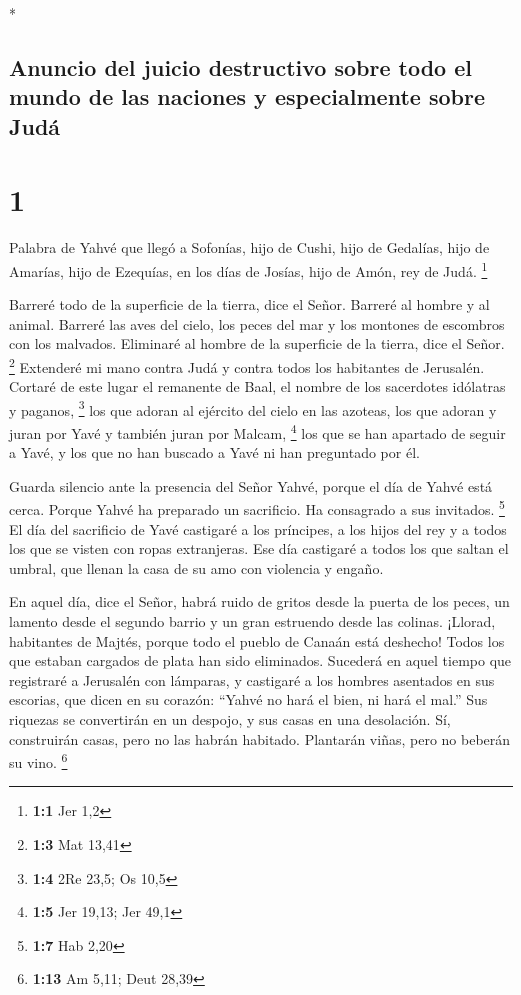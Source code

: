 \begin{paracol}{2} \switchcolumn[0]*

\hypertarget{anuncio-del-juicio-destructivo-sobre-todo-el-mundo-de-las-naciones-y-especialmente-sobre-juduxe1}{%
\subsection{Anuncio del juicio destructivo sobre todo el mundo de las
naciones y especialmente sobre
Judá}\label{anuncio-del-juicio-destructivo-sobre-todo-el-mundo-de-las-naciones-y-especialmente-sobre-juduxe1}}

\hypertarget{section}{%
\section{1}\label{section}}

 Palabra de Yahvé que llegó a Sofonías, hijo de Cushi,
hijo de Gedalías, hijo de Amarías, hijo de Ezequías, en los días de
Josías, hijo de Amón, rey de Judá. \footnote{\textbf{1:1} Jer 1,2}

 Barreré todo de la superficie de la tierra, dice el
Señor.  Barreré al hombre y al animal. Barreré las aves
del cielo, los peces del mar y los montones de escombros con los
malvados. Eliminaré al hombre de la superficie de la tierra, dice el
Señor. \footnote{\textbf{1:3} Mat 13,41}  Extenderé mi
mano contra Judá y contra todos los habitantes de Jerusalén. Cortaré de
este lugar el remanente de Baal, el nombre de los sacerdotes idólatras y
paganos, \footnote{\textbf{1:4} 2Re 23,5; Os 10,5}  los
que adoran al ejército del cielo en las azoteas, los que adoran y juran
por Yavé y también juran por Malcam, \footnote{\textbf{1:5} Jer 19,13;
  Jer 49,1}  los que se han apartado de seguir a Yavé, y
los que no han buscado a Yavé ni han preguntado por él.

 Guarda silencio ante la presencia del Señor Yahvé, porque
el día de Yahvé está cerca. Porque Yahvé ha preparado un sacrificio. Ha
consagrado a sus invitados. \footnote{\textbf{1:7} Hab 2,20}
 El día del sacrificio de Yavé castigaré a los príncipes,
a los hijos del rey y a todos los que se visten con ropas extranjeras.
 Ese día castigaré a todos los que saltan el umbral, que
llenan la casa de su amo con violencia y engaño.

 En aquel día, dice el Señor, habrá ruido de gritos desde
la puerta de los peces, un lamento desde el segundo barrio y un gran
estruendo desde las colinas.  ¡Llorad, habitantes de
Majtés, porque todo el pueblo de Canaán está deshecho! Todos los que
estaban cargados de plata han sido eliminados.  Sucederá
en aquel tiempo que registraré a Jerusalén con lámparas, y castigaré a
los hombres asentados en sus escorias, que dicen en su corazón: ``Yahvé
no hará el bien, ni hará el mal.''  Sus riquezas se
convertirán en un despojo, y sus casas en una desolación. Sí,
construirán casas, pero no las habrán habitado. Plantarán viñas, pero no
beberán su vino. \footnote{\textbf{1:13} Am 5,11; Deut 28,39}


\end{paracol}
